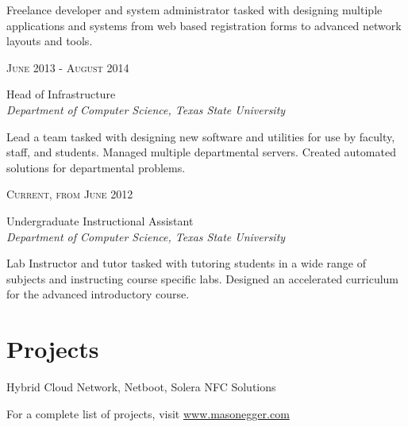 \documentclass[10pt]{article} %
\begin{document}
\begin{minipage}[t]{0.5\textwidth}
\normalsize{Freelance developer and system administrator tasked with designing multiple applications and systems from web based registration forms to advanced network layouts and tools.}\\


{\raggedleft\textsc{June 2013 - August 2014}\par}

{\raggedright\large Head of Infrastructure\\
\textit{Department of Computer Science, Texas State University}\\[5pt]}

\normalsize{Lead a team tasked with designing new software and utilities for use by faculty, staff, and students. Managed multiple departmental servers. Created automated solutions for departmental problems.}\\


{\raggedleft\textsc{Current, from June 2012}\par}

{\raggedright\large Undergraduate Instructional Assistant\\
\textit{Department of Computer Science, Texas State University}\\[5pt]}

\normalsize{Lab Instructor and tutor tasked with tutoring students in a wide range of subjects and instructing course specific labs. Designed an accelerated curriculum for the advanced introductory course.}\\

\section{Projects}

{\raggedright\large Hybrid Cloud Network, Netboot, Solera NFC Solutions\\}

\normalsize{For a complete list of projects, visit \href{http://www.masonegger.com}{www.masonegger.com}}\\

\end{minipage} %
\end{document}
